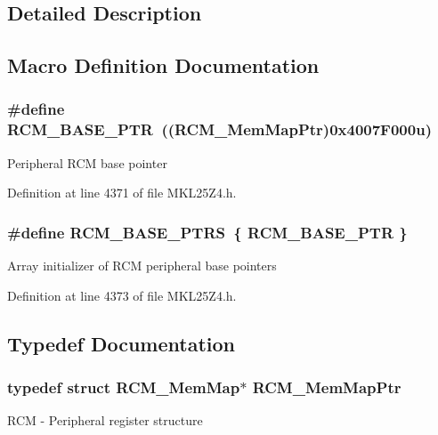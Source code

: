 \subsection{Detailed Description}


\subsection{Macro Definition Documentation}
\subsubsection[{\texorpdfstring{R\+C\+M\+\_\+\+B\+A\+S\+E\+\_\+\+P\+TR}{RCM_BASE_PTR}}]{\setlength{\rightskip}{0pt plus 5cm}\#define R\+C\+M\+\_\+\+B\+A\+S\+E\+\_\+\+P\+TR~(({\bf R\+C\+M\+\_\+\+Mem\+Map\+Ptr})0x4007\+F000u)}\hypertarget{group___r_c_m___peripheral_ga25ab3aa8d593d455ed36a52c77f88234}{}\label{group___r_c_m___peripheral_ga25ab3aa8d593d455ed36a52c77f88234}
Peripheral R\+CM base pointer 

Definition at line 4371 of file M\+K\+L25\+Z4.\+h.

\subsubsection[{\texorpdfstring{R\+C\+M\+\_\+\+B\+A\+S\+E\+\_\+\+P\+T\+RS}{RCM_BASE_PTRS}}]{\setlength{\rightskip}{0pt plus 5cm}\#define R\+C\+M\+\_\+\+B\+A\+S\+E\+\_\+\+P\+T\+RS~\{ {\bf R\+C\+M\+\_\+\+B\+A\+S\+E\+\_\+\+P\+TR} \}}\hypertarget{group___r_c_m___peripheral_gad8549fec4a09b0b485983beadfc3a5fb}{}\label{group___r_c_m___peripheral_gad8549fec4a09b0b485983beadfc3a5fb}
Array initializer of R\+CM peripheral base pointers 

Definition at line 4373 of file M\+K\+L25\+Z4.\+h.



\subsection{Typedef Documentation}
\subsubsection[{\texorpdfstring{R\+C\+M\+\_\+\+Mem\+Map\+Ptr}{RCM_MemMapPtr}}]{\setlength{\rightskip}{0pt plus 5cm}typedef struct {\bf R\+C\+M\+\_\+\+Mem\+Map}$\ast$ {\bf R\+C\+M\+\_\+\+Mem\+Map\+Ptr}}\hypertarget{group___r_c_m___peripheral_ga787b1c58d947f0b81c2502227dd0396b}{}\label{group___r_c_m___peripheral_ga787b1c58d947f0b81c2502227dd0396b}
R\+CM -\/ Peripheral register structure 